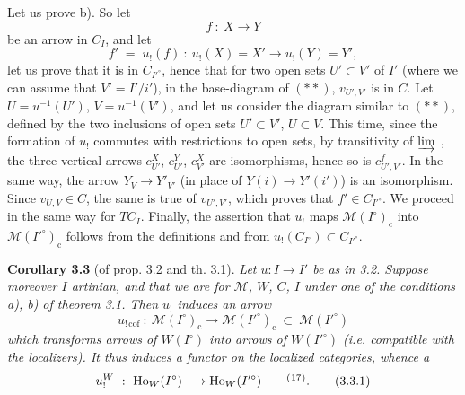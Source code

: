 Let us prove b). So let
\[
f\ :\ X\longrightarrow Y
\]
be an arrow in $C_I$, and let
\[
f' \;=\; u_!(f)\ :\ u_!(X)=X' \longrightarrow u_!(Y)=Y',
\]
let us prove that it is in $C_{I'^\circ}$, hence that
for two open sets $U'\subset V'$ of $I'$ (where we can assume that $V'=I'/i'$), in the base-diagram of $(**)$, $v_{U',V'}$ is in $C$. Let $U=u^{-1}(U')$, $V=u^{-1}(V')$, and let us consider the %
diagram similar to $(**)$, defined by the two inclusions of open sets $U'\subset V'$, $U\subset V$. This time, since the formation of $u_!$ commutes with restrictions to open sets, by transitivity of $\varinjlim$ , the three vertical arrows $c^X_{U'}$, $c^Y_{U'}$, $c^X_{V'}$ are isomorphisms, hence so is $c^f_{U',V'}$. In the same %
way, the arrow $Y_V\longrightarrow Y'_{V'}$ (in place of $Y(i)\longrightarrow Y'(i')$) is an isomorphism. Since $v_{U,V}\in C$, the same is true of $v_{U',V'}$, which proves that $f'\in C_{I'^\circ}$. We proceed in the same way for $TC_I$. Finally, the assertion that $u_!$ maps $\mathcal{M}(I^\circ)_{\mathrm{c}}$ into $\mathcal{M}(I'^\circ)_{\mathrm{c}}$ follows from the definitions and from $u_!(C_{I^\circ})\subset C_{I'^\circ}$.

\textbf{Corollary 3.3} (of prop. 3.2 and th. 3.1). \textit{Let $u:I\longrightarrow I'$ be as in \textup{3.2}. Suppose moreover $I$ artinian, and}
\textit{that we are for $\mathcal{M}$, $W$, $C$, $I$ under one of the conditions \textup{a), b)} of theorem \textup{3.1}. Then $u_!$ induces an arrow}
\[
u_{!\,\mathrm{cof}}\ :\ \mathcal{M}(I^\circ)_{\mathrm{c}} \longrightarrow \mathcal{M}(I'^\circ)_{\mathrm{c}}\ \subset\ \mathcal{M}(I'^\circ)
\]
\textit{which transforms arrows of $W(I^\circ)$ into arrows of $W(I'^\circ)$ (i.e. compatible with the localizers). It thus induces a functor on the localized categories, whence a}
\[
u_!^W\ :\ \mathrm{Ho}_W(I^\circ) \longrightarrow \mathrm{Ho}_W(I'^\circ) \qquad \mbox{\textsuperscript{(}\footnotemark[17]\textsuperscript{)}}.
\tag*{(3.3.1)}
\]

